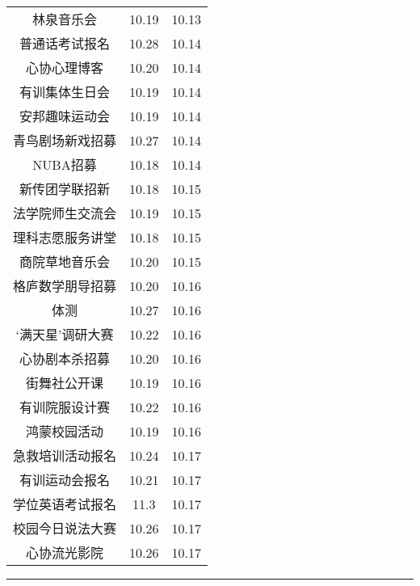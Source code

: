 \documentclass[letterpaper, 12pt]{article}
\begin{document}
\begin{multicols}{2}
{\begin{longtable}{|c|c|c|}
    林泉音乐会 & 10.19 & 10.13\\
    普通话考试报名 & 10.28 & 10.14\\
    心协心理博客 & 10.20 & 10.14\\
    有训集体生日会 & 10.19 & 10.14\\
    安邦趣味运动会 & 10.19 & 10.14\\
    青鸟剧场新戏招募 & 10.27 & 10.14\\
    NUBA招募 & 10.18 & 10.14\\
    新传团学联招新 & 10.18 & 10.15\\
    法学院师生交流会 & 10.19 & 10.15\\
    理科志愿服务讲堂 & 10.18 & 10.15\\
    商院草地音乐会 & 10.20 & 10.15\\
    格庐数学朋导招募 & 10.20 & 10.16\\
    体测 & 10.27 & 10.16\\
    ‘满天星’调研大赛 & 10.22 & 10.16\\
    心协剧本杀招募 & 10.20 & 10.16\\
    街舞社公开课 & 10.19 & 10.16\\
    有训院服设计赛 & 10.22 & 10.16\\
    鸿蒙校园活动 & 10.19 & 10.16\\
    急救培训活动报名 & 10.24 & 10.17\\
    有训运动会报名 & 10.21 & 10.17\\
    学位英语考试报名 & 11.3 & 10.17\\
    校园今日说法大赛 & 10.26 & 10.17\\
    心协流光影院 & 10.26 & 10.17\\
    \hline
\end{longtable}
\unskip
\unpenalty
\unpenalty}\unvbox\colbbox
\end{multicols}
\hrule
\pagebreak
\end{document}
